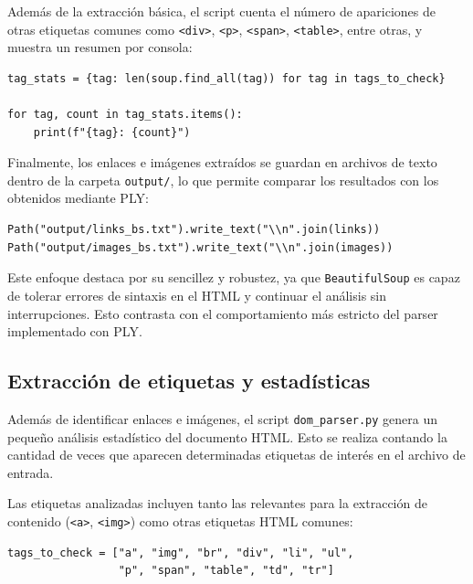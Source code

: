 \documentclass[11pt,a4paper]{article}
\begin{document}
\medskip

Además de la extracción básica, el script cuenta el número de apariciones de otras etiquetas comunes como \texttt{<div>}, \texttt{<p>}, \texttt{<span>}, \texttt{<table>}, entre otras, y muestra un resumen por consola:

\begin{verbatim}
tag_stats = {tag: len(soup.find_all(tag)) for tag in tags_to_check}

for tag, count in tag_stats.items():
    print(f"{tag}: {count}")
\end{verbatim}

\medskip

Finalmente, los enlaces e imágenes extraídos se guardan en archivos de texto dentro de la carpeta \texttt{output/}, lo que permite comparar los resultados con los obtenidos mediante PLY:

\begin{verbatim}
Path("output/links_bs.txt").write_text("\\n".join(links))
Path("output/images_bs.txt").write_text("\\n".join(images))
\end{verbatim}

\medskip

Este enfoque destaca por su sencillez y robustez, ya que \texttt{BeautifulSoup} es capaz de tolerar errores de sintaxis en el HTML y continuar el análisis sin interrupciones. Esto contrasta con el comportamiento más estricto del parser implementado con PLY.

\subsection{Extracción de etiquetas y estadísticas}

Además de identificar enlaces e imágenes, el script \texttt{dom\_parser.py} genera un pequeño análisis estadístico del documento HTML. Esto se realiza contando la cantidad de veces que aparecen determinadas etiquetas de interés en el archivo de entrada.

\medskip

Las etiquetas analizadas incluyen tanto las relevantes para la extracción de contenido (\texttt{<a>}, \texttt{<img>}) como otras etiquetas HTML comunes:

\begin{verbatim}
tags_to_check = ["a", "img", "br", "div", "li", "ul", 
                 "p", "span", "table", "td", "tr"]
\end{verbatim}
\end{document}
